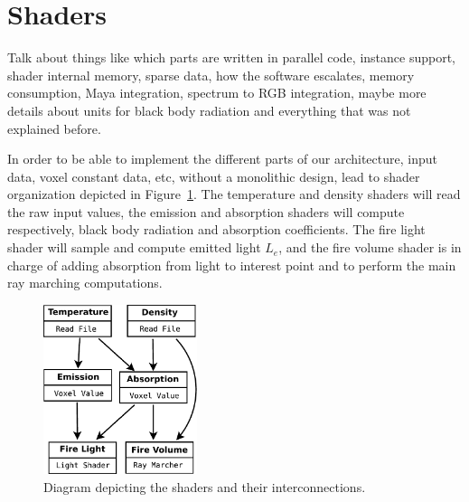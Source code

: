 \section{Shaders}
\label{sec:shaders}

Talk about things like which parts are written in parallel code, instance support, shader internal memory, sparse data, how the software escalates, memory consumption, Maya integration, spectrum to RGB integration, maybe more details about units for black body radiation and everything that was not explained before.

In order to be able to implement the different parts of our architecture, input data, voxel constant data, etc, without a monolithic design, lead to shader organization depicted in Figure~\ref{fig:shaders_diagram}.
The temperature and density shaders will read the raw input values, the emission and absorption shaders will compute respectively, black body radiation and absorption coefficients.
The fire light shader will sample and compute emitted light $L_e$, and the fire volume shader is in charge of adding absorption from light to interest point and to perform the main ray marching computations. 

\begin{figure}[htbp!]
	\centering
	\includegraphics[width=0.4\textwidth]{img/shaders_diagram}
	\caption{Diagram depicting the shaders and their interconnections.}
	\label{fig:shaders_diagram}
\end{figure}

